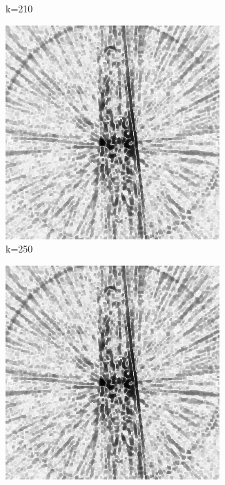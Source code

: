 \documentclass[journal]{IEEEtran}
\begin{document}
\begin{figure}[h]
\begin{subfigure}[b]{0.24\linewidth}
        \caption{k=210}
     \end{subfigure}
   \begin{subfigure}[b]{0.24\linewidth}
        \includegraphics[width=\textwidth]{../images/okra/2D_okra/weightsIm_250normalized.png}
        \caption{k=250}
     \end{subfigure}
   \begin{subfigure}[b]{0.24\linewidth}
        \includegraphics[width=\textwidth]{../images/okra/2D_okra/weightsIm_290normalized.png}

\end{subfigure}
\end{figure}
\end{document}
